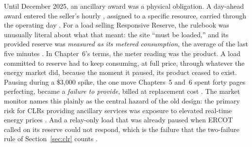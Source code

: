 Until December 2025, an ancillary award was a physical obligation. A day-ahead award entered the seller's hourly , assigned to a specific resource, carried through the operating day \autocite{ercotnodaldec2025}. %
For a load selling Responsive Reserve, the rulebook was unusually literal about what that meant: the site ``must be loaded,'' and its provided reserve was \emph{measured as its metered consumption}, the average of the last five minutes \autocite{ercotnodaldec2025}. %
In Chapter~6's terms, the meter reading was the product. A load committed to reserve had to keep consuming, at full price, through whatever the energy market did, because the moment it paused, its product ceased to exist. Pausing during a \$3,000 spike, the one move Chapters~5 and~6 spent forty pages perfecting, became a \emph{failure to provide}, billed at replacement cost \autocite{ercotnodaldec2025}. %
The market monitor names this plainly as the central hazard of the old design: the primary risk for CLRs providing ancillary services was exposure to elevated real-time energy prices \autocite{potomac2026somercot}. %
And a relay-only load that was already paused when ERCOT called on its reserve could not respond, which is the failure that the two-failure rule of Section~\ref{sec:clr} counts \autocite{ercotnodaldec2025}. %

